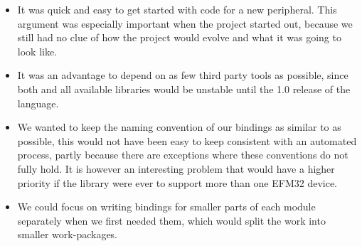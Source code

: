 \begin{itemize}
    \item It was quick and easy to get started with code for a new peripheral.
    This argument was especially important when the project started out, because we still had no clue of how the project would evolve and what it was going to look like.

    \item It was an advantage to depend on as few third party tools as possible, since both {\rust} and all available libraries would be unstable until the 1.0 release of the language.

    \item We wanted to keep the naming convention of our bindings as similar to {\emlib} as possible, this would not have been easy to keep consistent with an automated process, partly because there are exceptions where these conventions do not fully hold.
    It is however an interesting problem that would have a higher priority if the library were ever to support more than one EFM32 device.

    \item We could focus on writing bindings for smaller parts of each module separately when we first needed them, which would split the work into smaller work-packages.
\end{itemize}
